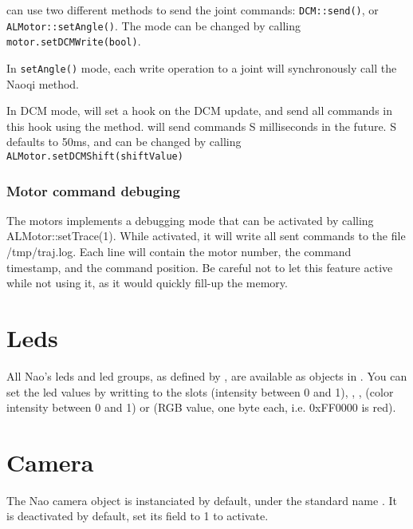 \urbi can use two different methods to send the joint commands:
\lstinline|DCM::send()|, or \lstinline|ALMotor::setAngle()|.
The mode can be changed by calling \lstinline|motor.setDCMWrite(bool)|.

In \lstinline|setAngle()| mode, each write operation to a joint will
synchronously call the  Naoqi method.

In DCM mode, \urbi will set a hook on the DCM update,
and send all commands in this hook using the  method.
\urbi will send commands S milliseconds in the future. S
defaults to 50ms, and can be changed by calling
\lstinline|ALMotor.setDCMShift(shiftValue)|

\subsubsection{Motor command debuging}

The motors implements a debugging mode that can be activated by calling
ALMotor::setTrace(1). While activated, it will write all sent commands to the
file /tmp/traj.log. Each line  will contain the motor number, the command
timestamp, and the command position.
Be careful not to let this feature active while not using it, as it would
quickly fill-up the memory.

\section{Leds}

All Nao's leds and led groups, as defined by \naoqi, are available as objects in
\us. You can set the led values by writting to the slots  (intensity
between 0 and 1), , ,  (color intensity between 0 and 1)
 or  (RGB value, one byte each, i.e. 0xFF0000 is red).

\section{Camera}

The Nao camera object is instanciated by default, under the standard name
. It is deactivated by default, set its  field to 1 to
activate.


